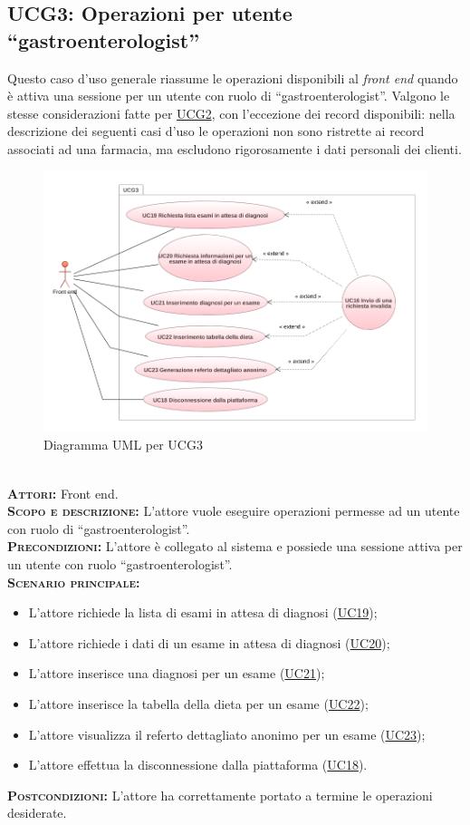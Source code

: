 \subsection{UCG3: Operazioni per utente ``gastroenterologist''}
\label{sec:UCG3}
Questo caso d'uso generale riassume le operazioni disponibili al \textit{front end} quando è attiva una sessione per un utente con ruolo di ``gastroenterologist''. Valgono le stesse considerazioni fatte per \hyperref[sec:UCG2]{UCG2}, con l'eccezione dei record disponibili: nella descrizione dei seguenti casi d'uso le operazioni non sono ristrette ai record associati ad una farmacia, ma escludono rigorosamente i dati personali dei clienti.
\begin{figure}[h!]
    \centering
    \includegraphics[width=\textwidth]{figures/uc/ucg3.png}
    \caption[Diagramma UML per UCG3]{Diagramma UML per UCG3
    \label{fig:ucg3}}
\end{figure}\\
\textsc{\textbf{Attori:}} Front end.\\
\textsc{\textbf{Scopo e descrizione:}} L'attore vuole eseguire operazioni permesse ad un utente con ruolo di ``gastroenterologist''.\\
\textsc{\textbf{Precondizioni:}} L'attore è collegato al sistema e possiede una sessione attiva per un utente con ruolo ``gastroenterologist''.\\
\textsc{\textbf{Scenario principale:}} 
\begin{itemize}
    \item L'attore richiede la lista di esami in attesa di diagnosi (\hyperref[sec:UC19]{UC19});
    \item L'attore richiede i dati di un esame in attesa di diagnosi (\hyperref[sec:UC20]{UC20});
    \item L'attore inserisce una diagnosi per un esame (\hyperref[sec:UC21]{UC21});
    \item L'attore inserisce la tabella della dieta per un esame (\hyperref[sec:UC22]{UC22});
    \item L'attore visualizza il referto dettagliato anonimo per un esame (\hyperref[sec:UC23]{UC23});
    \item L'attore effettua la disconnessione dalla piattaforma (\hyperref[sec:UC18]{UC18}).
\end{itemize}
\textsc{\textbf{Postcondizioni:}} L'attore ha correttamente portato a termine le operazioni desiderate.

